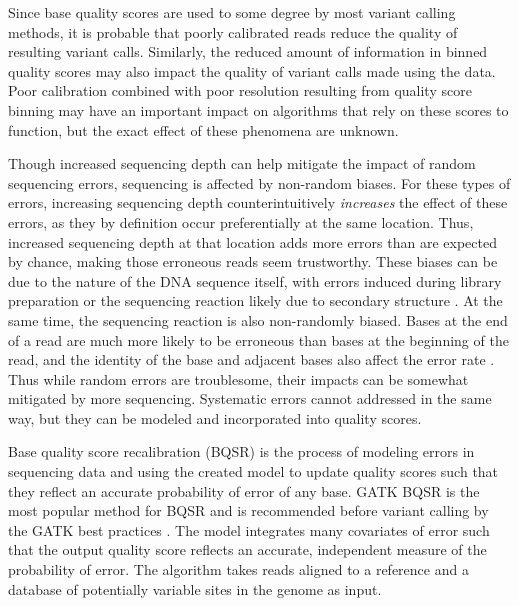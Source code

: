 Since base quality scores are used to some degree by most variant calling methods, it is probable that poorly calibrated reads reduce the quality of resulting variant calls.
Similarly, the reduced amount of information in binned quality scores may also impact the quality of variant calls made using the data.
Poor calibration combined with poor resolution resulting from quality score binning may have an important impact on algorithms that rely on these scores to function, but the exact effect of these phenomena are unknown.

Though increased sequencing depth can help mitigate the impact of random sequencing errors, sequencing is affected by non-random biases.
For these types of errors, increasing sequencing depth counterintuitively \textit{increases} the effect of these errors, as they by definition occur preferentially at the same location. Thus, increased sequencing depth at that location adds more errors than are expected by chance, making those erroneous reads seem trustworthy. 
These biases can be due to the nature of the DNA sequence itself, with errors induced during library preparation or the sequencing reaction likely due to secondary structure \parencite{meacham_identification_2011, nakamura_sequence-specific_2011, schirmer_insight_2015, ma_analysis_2019}.
At the same time, the sequencing reaction is also non-randomly biased. Bases at the end of a read are much more likely to be erroneous than bases at the beginning of the read, and the identity of the base and adjacent bases also affect the error rate \parencite{fox_accuracy_2014, schirmer_illumina_2016}. 
Thus while random errors are troublesome, their impacts can be somewhat mitigated by more sequencing. Systematic errors cannot addressed in the same way, but they can be modeled and incorporated into quality scores.

Base quality score recalibration (BQSR) is the process of modeling errors in sequencing data and using the created model to update quality scores such that they reflect an accurate probability of error of any base.
GATK BQSR  is the most popular method for BQSR and is recommended before variant calling by the GATK best practices \parencite{auwera_fastq_2013}.
The model integrates many covariates of error such that the output quality score reflects an accurate, independent measure of the probability of error.
The algorithm takes reads aligned to a reference and a database of potentially variable sites in the genome as input.

